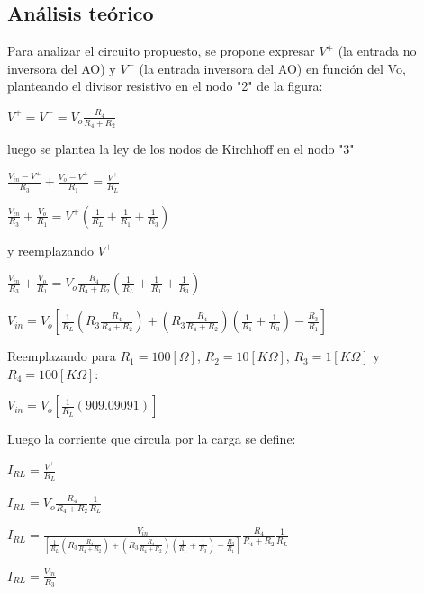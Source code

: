 \documentclass[11pt, a4paper]{article}
\begin{document}
\subsection{Análisis teórico}
Para analizar el circuito propuesto, se propone expresar $V^+$ (la entrada no inversora del AO) y $V^-$ (la entrada inversora del AO) en función del Vo, planteando el divisor resistivo en el nodo "2" de la figura:
\begin{center}
	$V^+ = V^- = V_o \frac{R_4}{R_4 + R_2}$
\end{center}
luego se plantea la ley de los nodos de Kirchhoff en el nodo "3"
\begin{center}
	$\frac{V_{in} - V^+ }{R_3} + \frac{V_o - V^+ }{R_1} = \frac{V^+}{R_L}$
\end{center}
\begin{center}
	$\frac{V_{in}}{R_3} + \frac{V_o}{R_1} = V^+ (\frac{1}{R_L} + \frac{1}{R_1} + \frac{1}{R_3})$
\end{center}
y reemplazando $V^+$
\begin{center}
	$\frac{V_{in}}{R_3} + \frac{V_o}{R_1} = V_o \frac{R_4}{R_4 + R_2} (\frac{1}{R_L} + \frac{1}{R_1} + \frac{1}{R_3})$
\end{center}
\begin{center}
	$V_{in} = V_o[\frac{1}{R_L}( R_3 \frac{R_4}{R_4 + R_2}) + (R_3 \frac{R_4}{R_4 + R_2}) (\frac{1}{R_1} + \frac{1}{R_3} ) - \frac{R_3}{R_1}]$
\end{center}
Reemplazando para $R_1=100[\Omega]$, $R_2=10[K\Omega]$, $R_3=1[K\Omega]$ y $R_4=100[K\Omega]$:
\begin{center}
	$V_{in} = V_o[\frac{1}{R_L}(909.09091)]$
\end{center}
Luego la corriente que circula por la carga se define:
\begin{center}
	$I_{RL} = \frac{V^+}{R_L}$
\end{center}
\begin{center}
	$I_{RL} = V_o \frac{R_4}{R_4 + R_2} \frac{1}{R_L}$
\end{center}
\begin{center}
	$I_{RL} = \frac{V_{in}}{[\frac{1}{R_L}( R_3 \frac{R_4}{R_4 + R_2}) + (R_3 \frac{R_4}{R_4 + R_2}) (\frac{1}{R_1} + \frac{1}{R_3} ) - \frac{R_3}{R_1}]} \frac{R_4}{R_4 + R_2} \frac{1}{R_L}$
\end{center}
\begin{center}
	$I_{RL} = \frac{V_{in}}{R_3}$
\end{center}
\begin{center}
\end{center}
\end{document}
